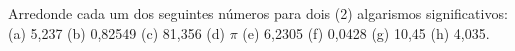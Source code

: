 Arredonde cada um dos seguintes números para dois (2) algarismos significativos: (a) 5,237 (b) 0,82549 (c) 81,356 (d) $\pi$ (e) 6,2305 (f) 0,0428 (g) 10,45 (h) 4,035.

